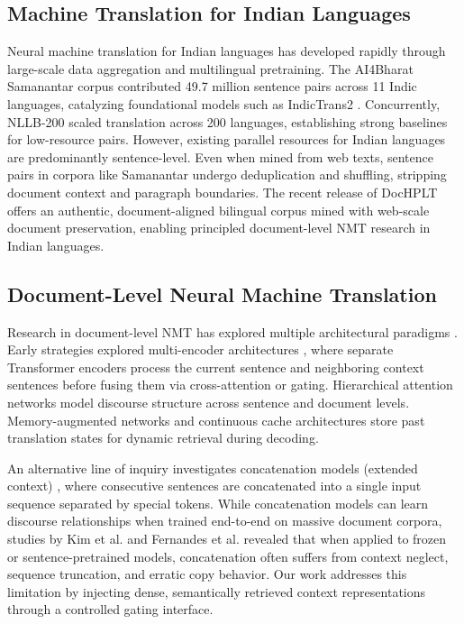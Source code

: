 \documentclass[conference]{IEEEtran}
\begin{document}
\subsection{Machine Translation for Indian Languages}
Neural machine translation for Indian languages has developed rapidly through large-scale data aggregation and multilingual pretraining. The AI4Bharat Samanantar corpus \cite{ramesh-etal-2022-samanantar} contributed 49.7 million sentence pairs across 11 Indic languages, catalyzing foundational models such as IndicTrans2 \cite{gala2023indictrans}. Concurrently, NLLB-200 \cite{costajussa2022nllb} scaled translation across 200 languages, establishing strong baselines for low-resource pairs. However, existing parallel resources for Indian languages are predominantly sentence-level. Even when mined from web texts, sentence pairs in corpora like Samanantar undergo deduplication and shuffling, stripping document context and paragraph boundaries. The recent release of DocHPLT \cite{obrien2025dochplt} offers an authentic, document-aligned bilingual corpus mined with web-scale document preservation, enabling principled document-level NMT research in Indian languages.

\subsection{Document-Level Neural Machine Translation}
Research in document-level NMT has explored multiple architectural paradigms \cite{maruf-etal-2021-survey}. Early strategies explored multi-encoder architectures \cite{jean2017does, voita-etal-2018-context, zhang-etal-2018-improving}, where separate Transformer encoders process the current sentence and neighboring context sentences before fusing them via cross-attention or gating. Hierarchical attention networks \cite{miculicich-etal-2018-document} model discourse structure across sentence and document levels. Memory-augmented networks \cite{maruf-haffari-2018-document} and continuous cache architectures \cite{tu-etal-2018-learning} store past translation states for dynamic retrieval during decoding.

An alternative line of inquiry investigates concatenation models (extended context) \cite{tiedemann-scherrer-2017-neural, ma-etal-2020-simple}, where consecutive sentences are concatenated into a single input sequence separated by special tokens. While concatenation models can learn discourse relationships when trained end-to-end on massive document corpora, studies by Kim et al. \cite{kim-etal-2019-document} and Fernandes et al. \cite{fernandes-etal-2021-measuring} revealed that when applied to frozen or sentence-pretrained models, concatenation often suffers from context neglect, sequence truncation, and erratic copy behavior. Our work addresses this limitation by injecting dense, semantically retrieved context representations through a controlled gating interface.
\end{document}
